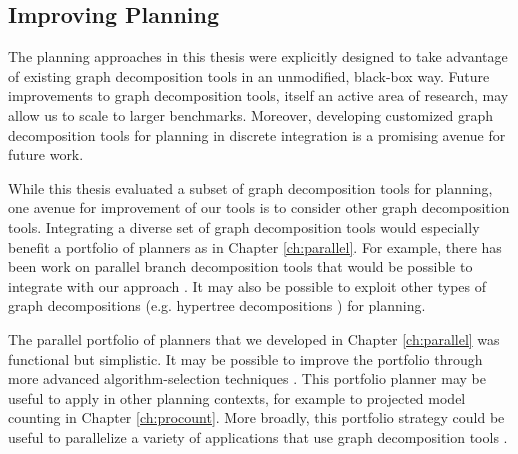 
\subsection{Improving Planning}
The planning approaches in this thesis were explicitly designed to take advantage of existing graph decomposition tools in an unmodified, black-box way.
Future improvements to graph decomposition tools, itself an active area of research, may allow us to scale to larger benchmarks.
Moreover, developing customized graph decomposition tools for planning in discrete integration is a promising avenue for future work.

While this thesis evaluated a subset of graph decomposition tools for planning, one avenue for improvement of our tools is to consider other graph decomposition tools.
Integrating a diverse set of graph decomposition tools would especially benefit a portfolio of planners as in Chapter \ref{ch:parallel}.
For example, there has been work on parallel branch decomposition tools that would be possible to integrate with our approach \cite{hicks2000branch}.
It may also be possible to exploit other types of graph decompositions (e.g. hypertree decompositions \cite{AGG07}) for planning.

The parallel portfolio of planners that we developed in Chapter \ref{ch:parallel} was functional but simplistic.
It may be possible to improve the portfolio through more advanced algorithm-selection techniques \cite{HHLKS09,XHHL12}. 
This portfolio planner may be useful to apply in other planning contexts, for example to projected model counting in Chapter \ref{ch:procount}.
More broadly, this portfolio strategy could be useful to parallelize a variety of applications that use graph decomposition tools \cite{MPPV04,applegate2011traveling,cygan2015parameterized,GLST17}.


